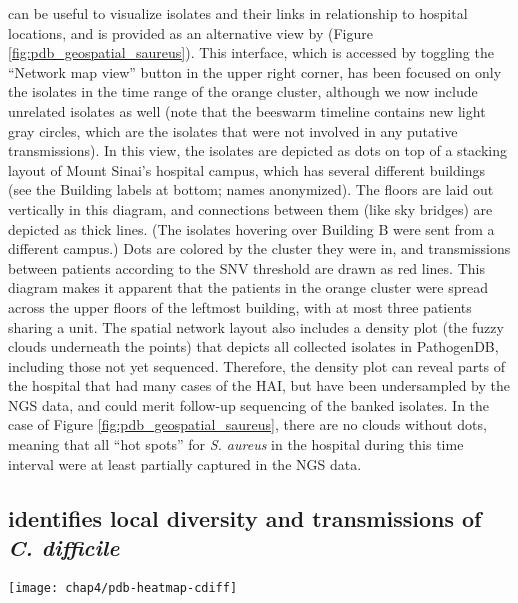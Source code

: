  can be useful to visualize isolates and their links in relationship to hospital locations, and is provided as an alternative view by \pathogendbviz{} (Figure \ref{fig:pdb_geospatial_saureus}). This interface, which is accessed by toggling the ``Network map view'' button in the upper right corner, has been focused on only the isolates in the time range of the orange cluster, although we now include unrelated isolates as well (note that the beeswarm timeline contains new light gray circles, which are the isolates that were not involved in any putative transmissions). In this view, the isolates are depicted as dots on top of a stacking layout of Mount Sinai's hospital campus, which has several different buildings (see the Building labels at bottom; names anonymized). The floors are laid out vertically in this diagram, and connections between them (like sky bridges) are depicted as thick lines. (The isolates hovering over Building B were sent from a different campus.) Dots are colored by the cluster they were in, and transmissions between patients according to the SNV threshold are drawn as red lines. This diagram makes it apparent that the patients in the orange cluster were spread across the upper floors of the leftmost building, with at most three patients sharing a unit. The spatial network layout also includes a density plot (the fuzzy clouds underneath the points) that depicts all collected isolates in PathogenDB, including those not yet sequenced. Therefore, the density plot can reveal parts of the hospital that had many cases of the HAI, but have been undersampled by the NGS data, and could merit follow-up sequencing of the banked isolates. In the case of Figure \ref{fig:pdb_geospatial_saureus}, there are no clouds without dots, meaning that all ``hot spots'' for \emph{S. aureus} in the hospital during this time interval were at least partially captured in the NGS data.

\subsection{\pathogendbviz{} identifies local diversity and transmissions of \emph{C. difficile}}

\begin{sidewaysfigure}[hp]
  \sidewaysvspace
  \centering
  \texttt{[image: chap4/pdb-heatmap-cdiff]}               
\end{sidewaysfigure}

